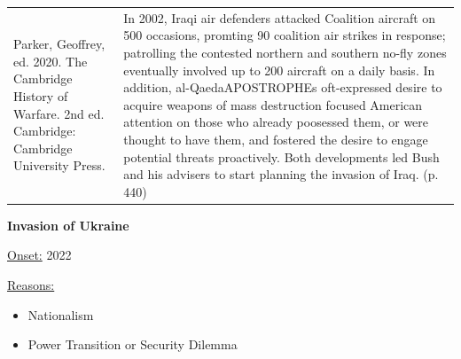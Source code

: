 {\begin{longtable}{p{}p{}}
\\
Parker, Geoffrey, ed. 2020. The Cambridge History of Warfare. 2nd ed. Cambridge: Cambridge University Press. & In 2002, Iraqi air defenders attacked Coalition aircraft on 500 occasions, promting 90 coalition air strikes in response; patrolling the contested northern and southern no-fly zones eventually involved up to 200 aircraft on a daily basis. In addition, al-QaedaAPOSTROPHEs oft-expressed desire to acquire weapons of mass destruction focused American attention on those who already poosessed them, or were thought to have them, and fostered the desire to engage potential threats proactively. Both developments led Bush and his advisers to start planning the invasion of Iraq. (p. 440)
\\
\end{longtable}}
\clearpage
         \textbf{Invasion of Ukraine} 

          \underline{Onset:} 2022         

\underline{Reasons:}
\begin{itemize}
\item Nationalism
\item Power Transition or Security Dilemma
\end{itemize}

